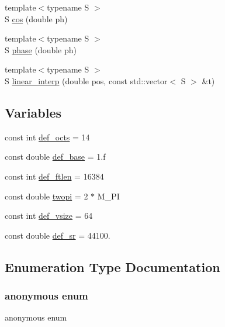 \begin{DoxyCompactItemize}
\item 
{\footnotesize template$<$typename S $>$ }\\S \hyperlink{namespace_aurora_ab6ef1b966b8f27d107fcabe1027a677a}{cos} (double ph)
\item 
{\footnotesize template$<$typename S $>$ }\\S \hyperlink{namespace_aurora_a2fab91108d29c7101741bcd2ebe1ba72}{phase} (double ph)
\item 
{\footnotesize template$<$typename S $>$ }\\S \hyperlink{namespace_aurora_acdc5f35b9cbf54f7fc84a423d76bd488}{linear\+\_\+interp} (double pos, const std\+::vector$<$ S $>$ \&t)
\end{DoxyCompactItemize}
\subsection*{Variables}
\begin{DoxyCompactItemize}
\item 
const int \hyperlink{namespace_aurora_a09d7b7aef171c72e46db6eac0226636b}{def\+\_\+octs} = 14
\item 
const double \hyperlink{namespace_aurora_acb267dff62f74484893c2d5b679b78bf}{def\+\_\+base} = 1.f
\item 
const int \hyperlink{namespace_aurora_a14dabfd9feedfa09c0e6f86d2627f006}{def\+\_\+ftlen} = 16384
\item 
const double \hyperlink{namespace_aurora_a4c08f8416c2b35d5001062f121459b5a}{twopi} = 2 $\ast$ M\+\_\+\+PI
\item 
const int \hyperlink{namespace_aurora_afaaddf667a06e7ce23c667a8b7295263}{def\+\_\+vsize} = 64
\item 
const double \hyperlink{namespace_aurora_ad49263d809bea98dd422e95bc91bc03e}{def\+\_\+sr} = 44100.
\end{DoxyCompactItemize}


\subsection{Enumeration Type Documentation}
\mbox{\label{namespace_aurora_a890b8d3786c8a25750e8097adae3b513}} 
\subsubsection{\texorpdfstring{anonymous enum}{anonymous enum}}
{\footnotesize\ttfamily anonymous enum}

